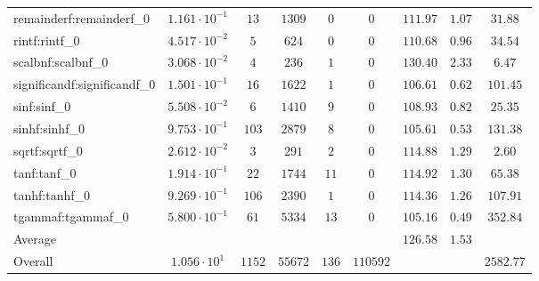 \begin{tabular}{|l|c|c|c|c|c|c|c|c|}
remainderf:remainderf\_0     & $ 1.161 \cdot 10^{-1} $ & $ 13     $ & $ 1309  $ & $ 0   $ & $ 0      $ & $ 111.97      $ & $ 1.07    $ & $ 31.88   $ \\
rintf:rintf\_0               & $ 4.517 \cdot 10^{-2} $ & $ 5      $ & $ 624   $ & $ 0   $ & $ 0      $ & $ 110.68      $ & $ 0.96    $ & $ 34.54   $ \\
scalbnf:scalbnf\_0           & $ 3.068 \cdot 10^{-2} $ & $ 4      $ & $ 236   $ & $ 1   $ & $ 0      $ & $ 130.40      $ & $ 2.33    $ & $ 6.47    $ \\
significandf:significandf\_0 & $ 1.501 \cdot 10^{-1} $ & $ 16     $ & $ 1622  $ & $ 1   $ & $ 0      $ & $ 106.61      $ & $ 0.62    $ & $ 101.45  $ \\
sinf:sinf\_0                 & $ 5.508 \cdot 10^{-2} $ & $ 6      $ & $ 1410  $ & $ 9   $ & $ 0      $ & $ 108.93      $ & $ 0.82    $ & $ 25.35   $ \\
sinhf:sinhf\_0               & $ 9.753 \cdot 10^{-1} $ & $ 103    $ & $ 2879  $ & $ 8   $ & $ 0      $ & $ 105.61      $ & $ 0.53    $ & $ 131.38  $ \\
sqrtf:sqrtf\_0               & $ 2.612 \cdot 10^{-2} $ & $ 3      $ & $ 291   $ & $ 2   $ & $ 0      $ & $ 114.88      $ & $ 1.29    $ & $ 2.60    $ \\
tanf:tanf\_0                 & $ 1.914 \cdot 10^{-1} $ & $ 22     $ & $ 1744  $ & $ 11  $ & $ 0      $ & $ 114.92      $ & $ 1.30    $ & $ 65.38   $ \\
tanhf:tanhf\_0               & $ 9.269 \cdot 10^{-1} $ & $ 106    $ & $ 2390  $ & $ 1   $ & $ 0      $ & $ 114.36      $ & $ 1.26    $ & $ 107.91  $ \\
tgammaf:tgammaf\_0           & $ 5.800 \cdot 10^{-1} $ & $ 61     $ & $ 5334  $ & $ 13  $ & $ 0      $ & $ 105.16      $ & $ 0.49    $ & $ 352.84  $ \\
\hline
Average                      & $                     $ & $        $ & $       $ & $     $ & $        $ & $ 126.58      $ & $ 1.53    $ & $         $ \\
\hline
Overall                      & $ 1.056 \cdot 10^{1}  $ & $ 1152   $ & $ 55672 $ & $ 136 $ & $ 110592 $ & $             $ & $         $ & $ 2582.77 $ \\
\hline
\end{tabular}
